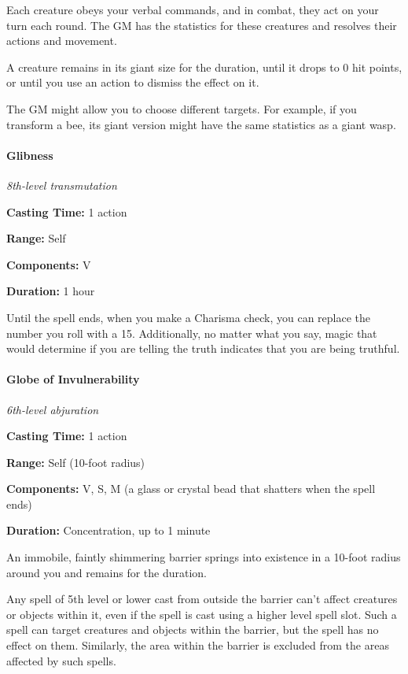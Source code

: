 \documentclass[
]{article}
\begin{document}
Each creature obeys your verbal commands, and in combat, they act on
your turn each round. The GM has the statistics for these creatures and
resolves their actions and movement.

A creature remains in its giant size for the duration, until it drops to
0 hit points, or until you use an action to dismiss the effect on it.

The GM might allow you to choose different targets. For example, if you
transform a bee, its giant version might have the same statistics as a
giant wasp.

\hypertarget{glibness}{%
\paragraph{Glibness}\label{glibness}}

\emph{8th-level transmutation}

\textbf{Casting Time:} 1 action

\textbf{Range:} Self

\textbf{Components:} V

\textbf{Duration:} 1 hour

Until the spell ends, when you make a Charisma check, you can replace
the number you roll with a 15. Additionally, no matter what you say,
magic that would determine if you are telling the truth indicates that
you are being truthful.

\hypertarget{globe-of-invulnerability}{%
\paragraph{Globe of Invulnerability}\label{globe-of-invulnerability}}

\emph{6th-level abjuration}

\textbf{Casting Time:} 1 action

\textbf{Range:} Self (10-foot radius)

\textbf{Components:} V, S, M (a glass or crystal bead that shatters when
the spell ends)

\textbf{Duration:} Concentration, up to 1 minute

An immobile, faintly shimmering barrier springs into existence in a
10-foot radius around you and remains for the duration.

Any spell of 5th level or lower cast from outside the barrier can't
affect creatures or objects within it, even if the spell is cast using a
higher level spell slot. Such a spell can target creatures and objects
within the barrier, but the spell has no effect on them. Similarly, the
area within the barrier is excluded from the areas affected by such
spells.
\end{document}
